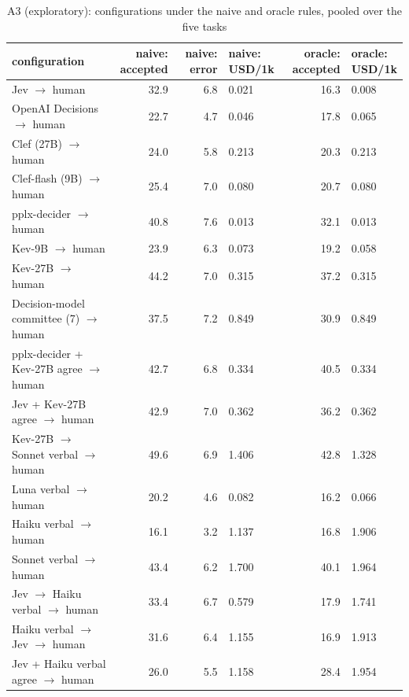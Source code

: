 \begin{table}[t]
\centering
\small
\caption{A3 (exploratory): configurations under the naive and oracle rules, pooled over the five tasks}
\label{tab:tab08_cascades}
\begin{adjustbox}{max width=\linewidth}
\begin{tabular}{lrrlrl}
\toprule
configuration & \makecell[br]{naive: \\{} accepted} & naive: error & naive: USD/1k & \makecell[br]{oracle: \\{} accepted} & \makecell[bl]{oracle: \\{} USD/1k} \\
\midrule
Jev $\rightarrow$ human & 32.9 & 6.8 & 0.021 & 16.3 & 0.008 \\
OpenAI Decisions $\rightarrow$ human & 22.7 & 4.7 & 0.046 & 17.8 & 0.065 \\
Clef (27B) $\rightarrow$ human & 24.0 & 5.8 & 0.213 & 20.3 & 0.213 \\
Clef-flash (9B) $\rightarrow$ human & 25.4 & 7.0 & 0.080 & 20.7 & 0.080 \\
pplx-decider $\rightarrow$ human & 40.8 & 7.6 & 0.013 & 32.1 & 0.013 \\
Kev-9B $\rightarrow$ human & 23.9 & 6.3 & 0.073 & 19.2 & 0.058 \\
Kev-27B $\rightarrow$ human & 44.2 & 7.0 & 0.315 & 37.2 & 0.315 \\
Decision-model committee (7) $\rightarrow$ human & 37.5 & 7.2 & 0.849 & 30.9 & 0.849 \\
pplx-decider + Kev-27B agree $\rightarrow$ human & 42.7 & 6.8 & 0.334 & 40.5 & 0.334 \\
Jev + Kev-27B agree $\rightarrow$ human & 42.9 & 7.0 & 0.362 & 36.2 & 0.362 \\
Kev-27B $\rightarrow$ Sonnet verbal $\rightarrow$ human & 49.6 & 6.9 & 1.406 & 42.8 & 1.328 \\
Luna verbal $\rightarrow$ human & 20.2 & 4.6 & 0.082 & 16.2 & 0.066 \\
Haiku verbal $\rightarrow$ human & 16.1 & 3.2 & 1.137 & 16.8 & 1.906 \\
Sonnet verbal $\rightarrow$ human & 43.4 & 6.2 & 1.700 & 40.1 & 1.964 \\
Jev $\rightarrow$ Haiku verbal $\rightarrow$ human & 33.4 & 6.7 & 0.579 & 17.9 & 1.741 \\
Haiku verbal $\rightarrow$ Jev $\rightarrow$ human & 31.6 & 6.4 & 1.155 & 16.9 & 1.913 \\
Jev + Haiku verbal agree $\rightarrow$ human & 26.0 & 5.5 & 1.158 & 28.4 & 1.954 \\

\end{tabular}
\end{adjustbox}
\end{table}
